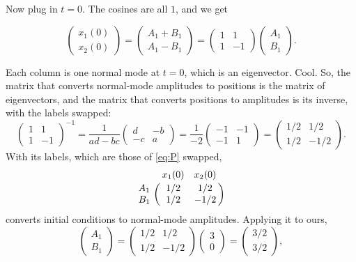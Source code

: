 \documentclass[12pt]{article}
\numberwithin{equation}{section}
\begin{document}
\noindent Now plug in $t = 0$. The cosines are all $1$, and we get

\begin{equation}
  \begin{pmatrix} x_1(0) \\ x_2(0) \end{pmatrix}
  = \begin{pmatrix} A_1 + B_1 \\ A_1 - B_1 \end{pmatrix}
  = \begin{pmatrix} 1 & 1 \\ 1 & -1 \end{pmatrix}
  \begin{pmatrix} A_1 \\ B_1 \end{pmatrix}.
\end{equation}

\noindent Each column is one normal mode at $t = 0$, which is an
eigenvector. Cool. So, the matrix that converts normal-mode amplitudes to
positions is the matrix of eigenvectors, and the matrix that converts
positions to amplitudes is its inverse, with the labels swapped:
\begin{equation}
  \begin{pmatrix} 1 & 1 \\ 1 & -1 \end{pmatrix}^{-1}
  = \frac{1}{ad - bc}\begin{pmatrix} d & -b \\ -c & a \end{pmatrix}
  = \frac{1}{-2}\begin{pmatrix} -1 & -1 \\ -1 & 1 \end{pmatrix}
  = \begin{pmatrix} 1/2 & 1/2 \\ 1/2 & -1/2 \end{pmatrix}.
\end{equation}
With its labels, which are those of \eqref{eq:P} swapped,
\begin{equation*}
  \lmat{x_1(0)}{x_2(0)}{A_1}{B_1}{1/2}{1/2}{1/2}{-1/2}
\end{equation*}
converts initial conditions to normal-mode amplitudes. Applying it to
ours,
\begin{equation}
  \begin{pmatrix} A_1 \\ B_1 \end{pmatrix}
  = \begin{pmatrix} 1/2 & 1/2 \\ 1/2 & -1/2 \end{pmatrix}
  \begin{pmatrix} 3 \\ 0 \end{pmatrix}
  = \begin{pmatrix} 3/2 \\ 3/2 \end{pmatrix},
\end{equation}
\end{document}
